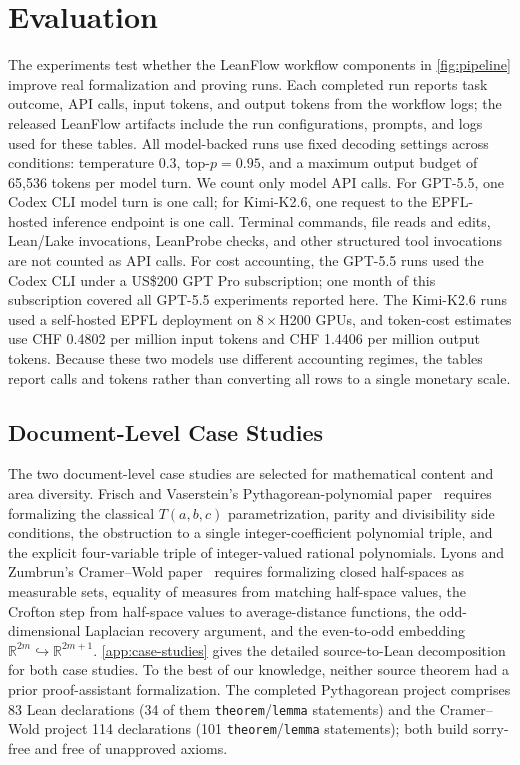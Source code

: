 \documentclass{article}
\newcommand{\method}{LeanFlow\xspace}
\newcommand{\kimi}{Kimi-K2.6\xspace}
\newcommand{\gpt}{GPT-5.5\xspace}
\newcommand{\lean}{Lean\xspace}
\begin{document}
\section{Evaluation}
\label{sec:experiments}

The experiments test whether the \method workflow components in \cref{fig:pipeline} improve real formalization and proving runs.
Each completed run reports task outcome, API calls, input tokens, and output tokens from the workflow logs; the released \method artifacts include the run configurations, prompts, and logs used for these tables.
All model-backed runs use fixed decoding settings across conditions: temperature $0.3$, top-$p=0.95$, and a maximum output budget of 65{,}536 tokens per model turn.
We count only model API calls.
For \gpt, one Codex CLI model turn is one call; for \kimi, one request to the EPFL-hosted inference endpoint is one call.
Terminal commands, file reads and edits, \lean/Lake invocations, LeanProbe checks, and other structured tool invocations are not counted as API calls.
For cost accounting, the \gpt runs used the Codex CLI under a US\$200 GPT Pro subscription; one month of this subscription covered all \gpt experiments reported here.
The \kimi runs used a self-hosted EPFL deployment on $8\times$H200 GPUs, and token-cost estimates use CHF 0.4802 per million input tokens and CHF 1.4406 per million output tokens.
Because these two models use different accounting regimes, the tables report calls and tokens rather than converting all rows to a single monetary scale.

\subsection{Document-Level Case Studies}

The two document-level case studies are selected for mathematical content and area diversity.
Frisch and Vaserstein's Pythagorean-polynomial paper~\citep{frisch2007pythagorean} requires formalizing the classical $T(a,b,c)$ parametrization, parity and divisibility side conditions, the obstruction to a single integer-coefficient polynomial triple, and the explicit four-variable triple of integer-valued rational polynomials.
Lyons and Zumbrun's Cramer--Wold paper~\citep{lyons2017cramerwold} requires formalizing closed half-spaces as measurable sets, equality of measures from matching half-space values, the Crofton step from half-space values to average-distance functions, the odd-dimensional Laplacian recovery argument, and the even-to-odd embedding $\mathbb{R}^{2m}\hookrightarrow\mathbb{R}^{2m+1}$.
\cref{app:case-studies} gives the detailed source-to-\lean decomposition for both case studies.
To the best of our knowledge, neither source theorem had a prior proof-assistant formalization.
The completed Pythagorean project comprises 83 \lean declarations (34 of them \texttt{theorem}/\texttt{lemma} statements) and the Cramer--Wold project 114 declarations (101 \texttt{theorem}/\texttt{lemma} statements); both build sorry-free and free of unapproved axioms.
\end{document}
